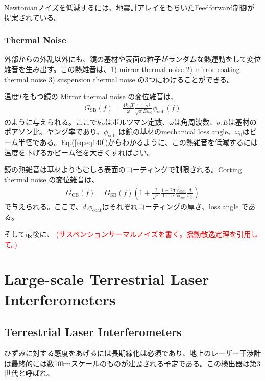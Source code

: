 Newtonianノイズを低減するには、地震計アレイをもちいたFeedforward制御が提案されている。

\subsubsection{Thermal Noise}
外部からの外乱以外にも、鏡の基材や表面の粒子がランダムな熱運動をして変位雑音を生み出す。この熱雑音は、1) mirror thermal noise 2) mirror coating thermal noise 3) suspension thermal noise の3つにわけることができる\cite{dan2016study}。

温度$T$をもつ鏡の Mirror thermal noise の変位雑音は、
\begin{eqnarray}
  G_{\mathrm{SB}}(f)=\frac{4 k_{B} T}{\omega} \frac{1-\sigma^{2}}{\sqrt{\pi} E w_{0}} \phi_{\mathrm{sub}}(f)
  \label{eq:eq140}
\end{eqnarray}
のように与えられる\cite{levin1998internal,numata2003wide}。ここで$k_{B}$はボルツマン定数、$\omega$は角周波数、$\sigma$,$E$は基材のポアソン比、ヤング率であり、$\phi_{\mathrm{sub}}$ は鏡の基材のmechanical loss angle、$\omega_0$はビーム半径である。Eq.(\ref{eq:eq140})からわかるように、この熱雑音を低減するには温度を下げるかビーム径を大きくすればよい。

鏡の熱雑音は基材よりもむしろ表面のコーティングで制限される。Corting thermal noise の変位雑音は、
\begin{eqnarray}
G_{\mathrm{CB}}(f)=G_{\mathrm{SB}}(f)\left(1+\frac{2}{\sqrt{\pi}} \frac{1-2 \sigma}{1-\sigma} \frac{\phi_{\mathrm{coat}}}{\phi_{\mathrm{sub}}} \frac{d}{w_{0}}\right)
\end{eqnarray}
で与えられる\cite{numata2003wide,harry2002thermal}。ここで、$d$,$\phi_{\mathrm{coat}}$はそれぞれコーティングの厚さ、loss angle である。

そして最後に、
\textcolor{red}{(サスペンションサーマルノイズを書く。揺動散逸定理を引用して。)}

\section{Large-scale Terrestrial Laser Interferometers}
\subsection{Terrestrial Laser Interferometers}
ひずみに対する感度をあげるには長期線化は必須であり、地上のレーザー干渉計は最終的には数10kmスケールのものが建設される予定である\cite{}。この検出器は第3世代と呼ばれ、

